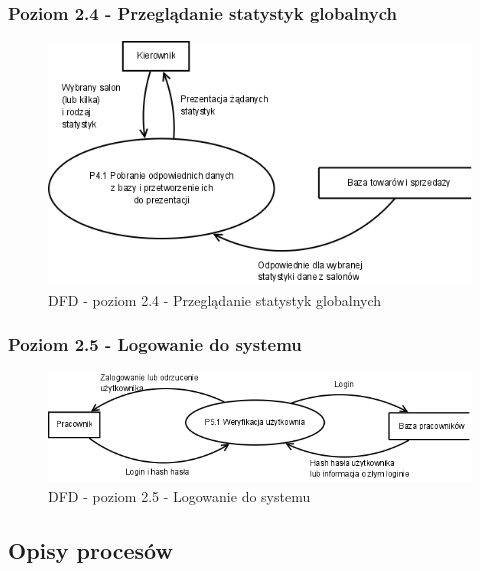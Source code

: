 \subsubsection{Poziom 2.4 - Przeglądanie statystyk globalnych}
\begin{figure}[h]
\includegraphics[width=1\textwidth]{gfx/dfd-2-4.png}
\caption{DFD - poziom 2.4 - Przeglądanie statystyk globalnych}
\end{figure}
\clearpage
\subsubsection{Poziom 2.5 - Logowanie do systemu}
\begin{figure}[h]
\includegraphics[width=1\textwidth]{gfx/dfd-2-5.png}
\caption{DFD - poziom 2.5 - Logowanie do systemu}
\end{figure}
\clearpage
\subsection{Opisy procesów}

